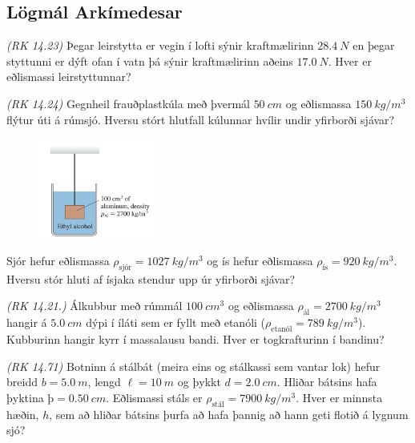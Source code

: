 \ifdefined \wholebook \else\documentclass[oneside]{book}\usepackage{EdlBook}\graphicspath{{figures/}}
\begin{document}
\begin{enumerate}[label = \textbf{Dæmi \thechapter.\arabic*.}]
\begin{minipage}{\linewidth}
\subsection*{Lögmál Arkímedesar}

\item \textit{(RK 14.23)} Þegar leirstytta er vegin í lofti sýnir kraftmælirinn $\SI{28.4}{N}$ en þegar styttunni er dýft ofan í vatn þá sýnir kraftmælirinn aðeins $\SI{17.0}{N}$. Hver er eðlismassi leirstyttunnar?

\item \textit{(RK 14.24)} Gegnheil frauðplastkúla með þvermál $\SI{50}{cm}$ og eðlismassa $\SI{150}{kg/m^3}$ flýtur úti á rúmsjó. Hversu stórt hlutfall kúlunnar hvílir undir yfirborði sjávar?

\end{minipage}

\begin{minipage}{\linewidth}

\begin{figure}
\vspace{-0.5cm}
\includegraphics[width=1.5in]{images/alkubb.png}
\end{figure}

\item Sjór hefur eðlismassa $\rho_{\text{sjór}} = \SI{1027}{kg/m^3}$ og ís hefur eðlismassa $\rho_{\text{ís}} = \SI{920}{kg/m^3}$. Hversu stór hluti af ísjaka stendur upp úr yfirborði sjávar?

\item \textit{(RK 14.21.)} Álkubbur með rúmmál $\SI{100}{cm^3}$ og eðlismassa $\rho_{\text{ál}} = \SI{2700}{kg/m^3}$ hangir á $\SI{5.0}{cm}$ dýpi í íláti sem er fyllt með etanóli ($\rho_{\text{etanól}} = \SI{789}{kg/m^3}$). Kubburinn hangir kyrr í massalausu bandi. Hver er togkrafturinn í bandinu?

\item \textit{(RK 14.71)} Botninn á stálbát (meira eins og stálkassi sem vantar lok) hefur breidd $b = \SI{5.0}{m}$, lengd $\ell = \SI{10}{m}$ og þykkt $d = \SI{2.0}{cm}$. Hliðar bátsins hafa þyktina $þ = \SI{0.50}{cm}$. Eðlismassi stáls er $\rho_{\text{stál}} = \SI{7900}{kg/m^3}$. Hver er minnsta hæðin, $h$, sem að hliðar bátsins þurfa að hafa þannig að hann geti flotið á lygnum sjó?


\end{minipage}
\end{enumerate}
\end{document}
